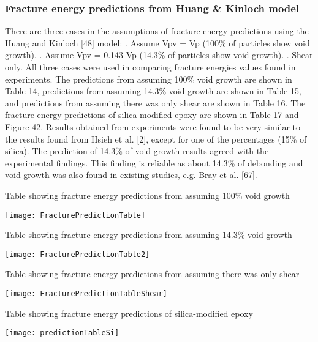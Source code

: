 \documentclass[numbers=noendperiod,chapterprefix=on]{icldt} %
\begin{document}
\subsubsection{Fracture energy predictions from Huang \& Kinloch model}

There are three cases in the assumptions of fracture energy predictions using the Huang and Kinloch [48] model:
.	Assume Vpv = Vp (100\% of particles show void growth). 
.	Assume Vpv = 0.143 Vp (14.3\% of particles show void growth). 
.	Shear only. 
\newline
All three cases were used in comparing fracture energies values found in experiments. 
The predictions from assuming 100\% void growth are shown in Table 14, predictions from assuming 14.3\% void growth are shown in Table 15, and predictions from assuming there was only shear are shown in Table 16. The fracture energy predictions of silica-modified epoxy are shown in Table 17 and Figure 42. Results obtained from experiments were found to be very similar to the results found from Hsieh et al. [2], except for one of the percentages (15\% of silica). The prediction of 14.3\% of void growth results agreed with the experimental findings. This finding is reliable as about 14.3\% of debonding and void growth was also found in existing studies, e.g. Bray et al. [67]. 

\begin{table}[!htpb]
\centering
\caption{Table showing fracture energy predictions from assuming 100\% void growth} %
\texttt{[image: FracturePredictionTable]}
\end{table}

\begin{table}[!htpb]
\centering
\caption{Table showing fracture energy predictions from assuming 14.3\% void growth } %
\texttt{[image: FracturePredictionTable2]}
\end{table}

\begin{table}[!htpb]
\centering
\caption{Table showing fracture energy predictions from assuming there was only shear } %
\texttt{[image: FracturePredictionTableShear]}
\end{table}

\begin{table}[!htpb]
\centering
\caption{Table showing fracture energy predictions of silica-modified epoxy} %
\texttt{[image: predictionTableSi]}
\end{table}
\end{document}
